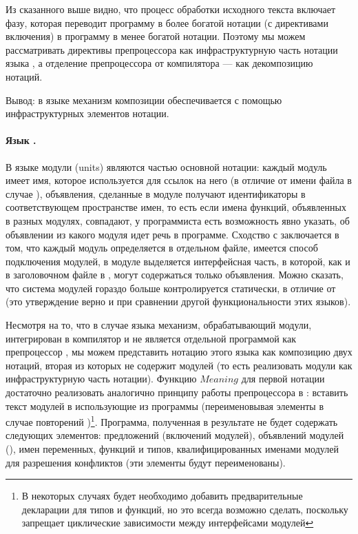{Из сказанного выше видно, что процесс обработки исходного текста включает фазу, которая переводит программу в более богатой нотации (с директивами включения) в программу в менее богатой нотации. Поэтому мы можем рассматривать директивы препроцессора как инфраструктурную часть нотации языка , а отделение препроцессора от компилятора --- как декомпозицию нотаций. 

Вывод: в языке  механизм композиции обеспечивается с помощью инфраструктурных элементов нотации. 

\paragraph*{Язык . } В языке  \cite{???} модули (units) являются частью основной нотации: каждый модуль имеет имя, которое используется для ссылок на него (в отличие от имени файла в случае ), объявления, сделанные в модуле получают идентификаторы в соответствующем пространстве имен, то есть если имена функций, объявленных в разных модулях, совпадают, у программиста есть возможность явно указать, об объявлении из какого модуля идет речь в программе. Сходство с  заключается в том, что каждый модуль определяется в отдельном файле, имеется способ подключения модулей, в модуле выделяется интерфейсная часть, в которой, как и в заголовочном файле в , могут содержаться только объявления. Можно сказать, что система модулей  гораздо больше контролируется статически, в отличие от  (это утверждение верно и при сравнении другой функциональности этих языков). 

Несмотря на то, что в случае языка  механизм, обрабатывающий модули, интегрирован в компилятор и не является отдельной программой как препроцессор , мы можем представить нотацию этого языка как композицию двух нотаций, вторая из которых не содержит модулей (то есть реализовать модули как инфраструктурную часть нотации). Функцию $Meaning$ для первой нотации достаточно реализовать аналогично принципу работы препроцессора в : вставить текст модулей в использующие из программы (переименовывая элементы в случае повторений \cite{capture-avoiding-substitution})\footnote{В некоторых случаях будет необходимо добавить предварительные декларации для типов и функций, но это всегда возможно сделать, поскольку  запрещает циклические зависимости между интерфейсами модулей}. Программа, полученная в результате не будет содержать следующих элементов: предложений  (включений модулей), объявлений модулей (), имен переменных, функций и типов, квалифицированных именами модулей для разрешения конфликтов (эти элементы будут переименованы).

}
